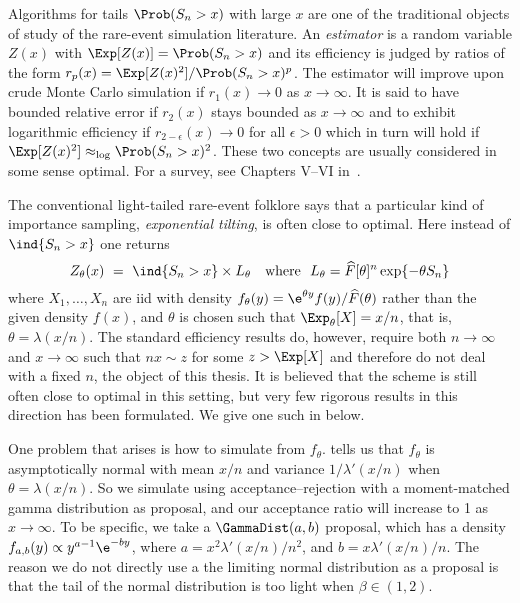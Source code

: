 Algorithms for tails $\Prob(S_n > x)$ with large $x$ are one of the traditional objects
of study of the rare-event simulation literature.
An \emph{estimator} is a random variable $Z(x)$ with $\Exp [Z(x)]=\Prob(S_n > x)$ and its efficiency
is judged by ratios of the form $r_p(x)=\Exp [Z(x)^2]/\Prob(S_n > x)^p$. The
estimator will improve upon crude Monte Carlo simulation if $r_1(x)\to 0$ as $x\to\infty$. It is said to have bounded relative error if $r_2(x) $ stays bounded as $x\to\infty$ and to
exhibit logarithmic efficiency if $r_{2-\epsilon}(x)\to 0$ for all $\epsilon>0$ which in turn
will hold if $\Exp [Z(x)^2]\approx_{\log} \Prob(S_n > x)^2$. These two concepts are
usually considered in some sense optimal. For a survey, see Chapters
V--VI in~\cite{asmussen2007stochastic}.

%
The conventional light-tailed rare-event folklore says that a particular kind of importance sampling, \emph{exponential tilting}, is often close to optimal. Here
instead of
$\ind{S_n>x}$ one returns
\[ Z_\theta(x)\  = \
\ind{S_n > x}
\times L_\theta\quad \text{where\ \ }L_\theta=\widehat{F}[\theta]^n \exp\{ {-}\theta S_n\} \]
where $ X_1,\ldots,X_n $ are iid with density  $f_\theta(y) = \e^{\theta y} f(y) / \widehat{F}(\theta)$
 rather than the given density $f(x)$, and $\theta$ is chosen such that
$\Exp_\theta [X] =x/n$, that is, $\theta=\lambda(x/n)$. The standard efficiency
results do, however, require both $n\to\infty$ and $x\to\infty$ such that $nx\sim z$
for some $z>\Exp [X]$ and therefore
do not deal with a fixed $n$, the object of this thesis. It is believed that the scheme
is still often close to optimal in this setting, but very few rigorous results in this direction
has been formulated. We give one such in \prop{Prop:PL} below.

One problem that arises is how to simulate from $f_\theta$.
 tells us that $f_\theta$ is asymptotically normal
with mean $x/n$ and variance $1/\lambda'(x/n)$ when $\theta=\lambda(x/n)$.
So we simulate using acceptance--rejection with a moment-matched
gamma distribution as proposal, and our acceptance ratio will increase to 1 as $x \to \infty$.
To be specific, we take a $\GammaDist(a, b)$ proposal, which has a density
$f_{a,b}(y) \propto y^{a-1}\e^{-b y}$, where $a = x^2 \lambda'(x/n)/n^2$, and $b=x \lambda'(x/n)/n$.
The reason we do not directly use a the limiting normal distribution as a proposal is that the tail of the normal distribution is too light when $\beta \in (1,2)$.

